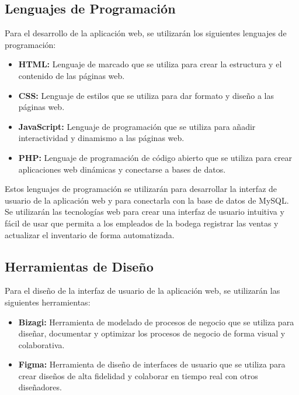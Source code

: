 \documentclass{article}
\begin{document}
  \subsection{Lenguajes de Programación}

    Para el desarrollo de la aplicación web, se utilizarán los siguientes lenguajes de programación:

    \begin{itemize}
      \item \textbf{HTML:} Lenguaje de marcado que se utiliza para crear la estructura y el contenido de las páginas web.
      \item \textbf{CSS:} Lenguaje de estilos que se utiliza para dar formato y diseño a las páginas web.
      \item \textbf{JavaScript:} Lenguaje de programación que se utiliza para añadir interactividad y dinamismo a las páginas web.
      \item \textbf{PHP:} Lenguaje de programación de código abierto que se utiliza para crear aplicaciones web dinámicas y conectarse a bases de datos.
    \end{itemize}

    Estos lenguajes de programación se utilizarán para desarrollar la interfaz de usuario de la aplicación web y para conectarla con la base de datos de MySQL. Se utilizarán las tecnologías web para crear una interfaz de usuario intuitiva y fácil de usar que permita a los empleados de la bodega registrar las ventas y actualizar el inventario de forma automatizada.
\vspace{-0.5cm}
  \subsection{Herramientas de Diseño}

    Para el diseño de la interfaz de usuario de la aplicación web, se utilizarán las siguientes herramientas:

    \begin{itemize}
      \item \textbf{Bizagi:} Herramienta de modelado de procesos de negocio que se utiliza para diseñar, documentar y optimizar los procesos de negocio de forma visual y colaborativa.
      \item \textbf{Figma:} Herramienta de diseño de interfaces de usuario que se utiliza para crear diseños de alta fidelidad y colaborar en tiempo real con otros diseñadores.
    \end{itemize}
\end{document}
